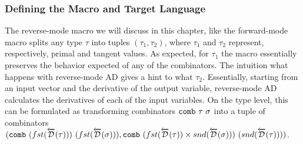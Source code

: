 \subsubsection{Defining the Macro and Target Language}\label{sec:combinator-macro}
  The reverse-mode macro we will discuss in this chapter, like the forward-mode macro splits any type $\tau$ into tuples $(\tau_1, \tau_2)$, where $\tau_1$ and $\tau_2$ represent, respectively, primal and tangent values.
  As expected, for $\tau_1$ the macro essentially preserves the behavior expected of any of the combinators.
  The intuition what happens with reverse-mode AD gives a hint to what $\tau_2$.
  Essentially, starting from an input vector and the derivative of the output variable, reverse-mode AD calculates the derivatives of each of the input variables.
  On the type level, this can be formulated as transforming combinators $\texttt{comb}\ \tau\ \sigma$ into a tuple of combinators $(\texttt{comb}\ (fst(\overleftarrow{\mathcal{D}}(\tau)))\ (fst(\overleftarrow{\mathcal{D}}(\sigma))), \texttt{comb}\ (fst(\overleftarrow{\mathcal{D}}(\tau)) \times snd(\overleftarrow{\mathcal{D}}(\sigma)))\ (snd(\overleftarrow{\mathcal{D}}(\tau))))$.

